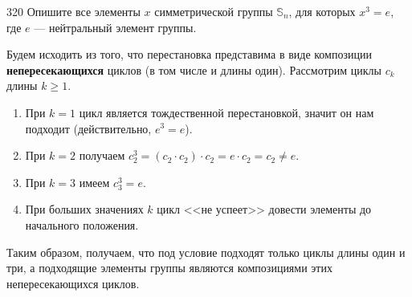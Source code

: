 \begin{task}{320}
Опишите все элементы $x$ симметрической группы $\mathbb{S}_n$, для которых $x^3=e$, где $e$ — нейтральный элемент группы.
\end{task}

\begin{solution}
Будем исходить из того, что перестановка представима в виде композиции \textbf{непересекающихся} циклов (в том числе и длины один). Рассмотрим циклы $c_k$ длины $k\geq1$.
\begin{enumerate}
    \item При $k=1$ цикл является тождественной перестановкой, значит он нам подходит (действительно, $e^3=e$).
    \item При $k=2$ получаем $c_2^3=(c_2\cdot c_2)\cdot c_2=e\cdot c_2=c_2\neq e$.
    \item При $k=3$ имеем $c_3^3=e$.
    \item При больших значениях $k$ цикл <<не успеет>> довести элементы до начального положения.
\end{enumerate}
Таким образом, получаем, что под условие подходят только циклы длины один и три, а подходящие элементы группы являются композициями этих непересекающихся циклов.
\end{solution}